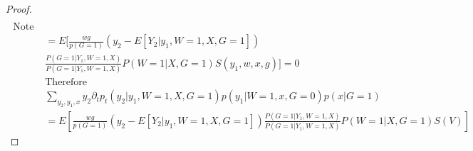 \documentclass{article}
\begin{document}
\begin{proof}
\begin{align}
\end{align}
\begin{align}
\text{    Note that } \\
&=    E [  \frac{ w g }{ p (G = 1) } ( y_2 - E [ Y_2 | y_1 , W = 1, X, G =1 ] )   \\
&\frac{ P( G =1 | Y_1 , W=1 , X ) }{ P(G=1 | Y_1 , W=1 , X ) } P( W=1 | X , G=1)   S (  y_1 , w, x , g) ] = 0 \\
&\text{Therefore  }\\
&\sum_ { y_2 ,y_1,x} y_2 \partial_t p_t ( y_2| y_1 , W= 1, X , G= 1) p ( y_1 | W =1 , x, G= 0 ) p( x | G =1 ) \\
&= E [  \frac{ w g }{ p (G = 1) } ( y_2 - E [ Y_2 | y_1 , W = 1, X, G =1 ] )     \frac{ P( G =1 | Y_1 , W=1 , X ) }{ P(G=1 | Y_1 , W=1 , X ) } P( W=1 | X , G=1)   S ( V) ]
\end{align}



\end{proof}
\end{document}
